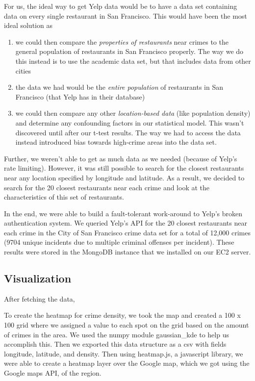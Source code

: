 \documentclass{article}
\begin{document}
For us, the ideal way to get Yelp data would be to have a data set
containing data on every single restaurant in San Francisco. This would
have been the most ideal solution as
\begin{enumerate}
\item we could then compare the \textit{properties of restaurants} near
  crimes to the general population of restaurants in San Francisco
  properly. The way we do this instead is to use the academic data set, but
  that includes data from other cities
\item the data we had would be the \textit{entire population} of restaurants in San
  Francisco (that Yelp has in their database)
\item we could then compare any other \textit{location-based data} (like
  population density) and determine any confounding factors in our
  statistical model. This wasn't discovered until after our t-test
  results. The way we had to access the data instead introduced bias
  towards high-crime areas into the data set.
\end{enumerate}

Further, we weren't able to get as much data as we needed (because of
Yelp's rate limiting). However, it was still possible to search for the
closest restaurants near any location specified by longitude and
latitude. As a result, we decided to search for the 20 closest restaurants
near each crime and look at the characteristics of this set of restaurants.

In the end, we were able to build a fault-tolerant work-around to Yelp's
broken authentication system. We queried Yelp's API for the 20 closest
restaurants near each crime in the City of San Francisco crime data set for
a total of 12,000 crimes (9704 unique incidents due to multiple criminal
offenses per incident). These results were stored in the MongoDB instance
that we installed on our EC2 server.

\subsection{Visualization}

After fetching the data, %

To create the heatmap for crime density, we took the map and created a 100
x 100 grid where we assigned a value to each spot on the grid based on the
amount of crimes in the area. We used the numpy module gaussian\_kde to help
us accomplish this. Then we exported this data structure as a csv with
fields longitude, latitude, and density. Then using heatmap.js, a
javascript library, we were able to create a heatmap layer over the Google
map, which we got using the Google maps API, of the region.
\end{document}

